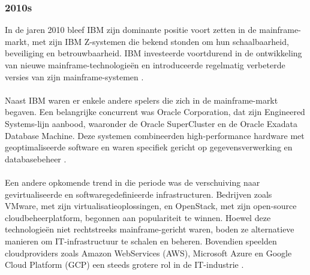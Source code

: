 \subsubsection{2010s}
In de jaren 2010 bleef IBM zijn dominante positie voort zetten in de mainframe-markt, met zijn IBM Z-systemen die bekend stonden om hun schaalbaarheid, beveiliging en betrouwbaarheid. IBM investeerde voortdurend in de ontwikkeling van nieuwe mainframe-technologieën en introduceerde regelmatig verbeterde versies van zijn mainframe-systemen \autocite{IBM2024d}.
\\ \\
Naast IBM waren er enkele andere spelers die zich in de mainframe-markt begaven. Een belangrijke concurrent was Oracle Corporation, dat zijn Engineered Systems-lijn aanbood, waaronder de Oracle SuperCluster en de Oracle Exadata Database Machine. Deze systemen combineerden high-performance hardware met geoptimaliseerde software en waren specifiek gericht op gegevensverwerking en databasebeheer \autocite{Oracle}.
\\ \\
Een andere opkomende trend in die periode was de verschuiving naar gevirtualiseerde en softwaregedefinieerde infrastructuren. Bedrijven zoals VMware, met zijn virtualisatieoplossingen, en OpenStack, met zijn open-source cloudbeheerplatform, begonnen aan populariteit te winnen. Hoewel deze technologieën niet rechtstreeks mainframe-gericht waren, boden ze alternatieve manieren om IT-infrastructuur te schalen en beheren. Bovendien speelden cloudproviders zoals Amazon WebServices (AWS), Microsoft Azure en Google Cloud Platform (GCP) een steeds grotere rol in de IT-industrie \autocite{Google} \autocite{AWS} \autocite{VMWare}.
\\ \\
